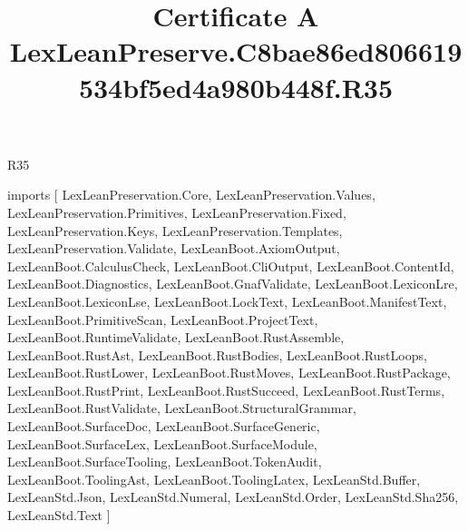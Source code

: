 \begin{lexlean}{R35}
\title{Certificate A LexLeanPreserve.C8bae86ed806619534bf5ed4a980b448f.R35}
\begin{coremodule}
imports [
  LexLeanPreservation.Core,
  LexLeanPreservation.Values,
  LexLeanPreservation.Primitives,
  LexLeanPreservation.Fixed,
  LexLeanPreservation.Keys,
  LexLeanPreservation.Templates,
  LexLeanPreservation.Validate,
  LexLeanBoot.AxiomOutput,
  LexLeanBoot.CalculusCheck,
  LexLeanBoot.CliOutput,
  LexLeanBoot.ContentId,
  LexLeanBoot.Diagnostics,
  LexLeanBoot.GnafValidate,
  LexLeanBoot.LexiconLre,
  LexLeanBoot.LexiconLse,
  LexLeanBoot.LockText,
  LexLeanBoot.ManifestText,
  LexLeanBoot.PrimitiveScan,
  LexLeanBoot.ProjectText,
  LexLeanBoot.RuntimeValidate,
  LexLeanBoot.RustAssemble,
  LexLeanBoot.RustAst,
  LexLeanBoot.RustBodies,
  LexLeanBoot.RustLoops,
  LexLeanBoot.RustLower,
  LexLeanBoot.RustMoves,
  LexLeanBoot.RustPackage,
  LexLeanBoot.RustPrint,
  LexLeanBoot.RustSucceed,
  LexLeanBoot.RustTerms,
  LexLeanBoot.RustValidate,
  LexLeanBoot.StructuralGrammar,
  LexLeanBoot.SurfaceDoc,
  LexLeanBoot.SurfaceGeneric,
  LexLeanBoot.SurfaceLex,
  LexLeanBoot.SurfaceModule,
  LexLeanBoot.SurfaceTooling,
  LexLeanBoot.TokenAudit,
  LexLeanBoot.ToolingAst,
  LexLeanBoot.ToolingLatex,
  LexLeanStd.Buffer,
  LexLeanStd.Json,
  LexLeanStd.Numeral,
  LexLeanStd.Order,
  LexLeanStd.Sha256,
  LexLeanStd.Text
]


\end{coremodule}
\end{lexlean}
